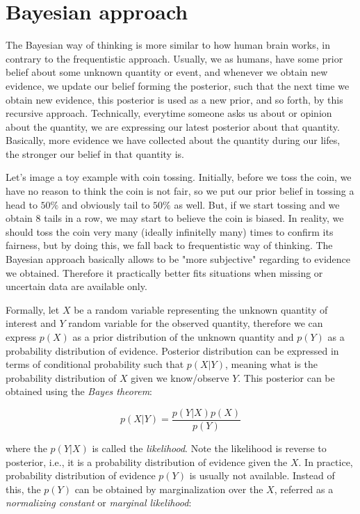 \documentclass[
  digital, %
  oneside, %
  lof,     %
  lot,     %
]{fithesis4}
\begin{document}
\section{Bayesian approach}

The Bayesian way of thinking is more similar to how human 
brain works, in contrary to the frequentistic approach. 
Usually, we as humans, have some prior belief about some 
unknown quantity or event, and whenever we obtain new 
evidence, we update our belief forming the posterior, such 
that the next time we obtain new evidence, this posterior 
is used as a new prior, and so forth, by this recursive approach.
Technically, everytime someone asks us about or opinion 
about the quantity, we are expressing our latest posterior 
about that quantity. 
Basically, more evidence we have collected about the 
quantity during our lifes, the stronger our belief in 
that quantity is.

Let's image a toy example with coin tossing. 
Initially, before we toss the coin, we have no reason 
to think the coin is not fair, so we put our prior belief 
in tossing a head to $50\%$ and obviously tail to 
$50\%$ as well. 
But, if we start tossing and we obtain 8 tails in a row, 
we may start to believe the coin is biased. 
In reality, we should toss the coin very many (ideally 
infinitelly many) times to confirm its fairness, but 
by doing this, we fall back to frequentistic way of 
thinking. 
The Bayesian approach basically allows to be 
"more subjective" regarding to evidence we obtained. 
Therefore it practically better fits situations when 
missing or uncertain data are available only.

Formally, let $X$ be a random variable representing 
the unknown quantity of interest and $Y$ random variable for 
the observed quantity, therefore we can express $p(X)$ 
as a prior distribution of the unknown quantity and 
$p(Y)$ as a probability distribution of evidence. 
Posterior distribution can be expressed in terms of 
conditional probability such that $p(X | Y)$, meaning 
what is the probability distribution of $X$ given we 
know/observe $Y$. 
This posterior can be obtained using the \textit{Bayes 
theorem}:

\begin{equation}\label{eq:bayes-theorem}
p( X | Y ) = \frac{p( Y | X ) p(X)}{p(Y)}
\end{equation}

where the $p( Y | X )$ is called the \textit{likelihood}.
Note the likelihood is reverse to posterior, i.e., it 
is a probability distribution of evidence given the $X$.
In practice, probability distribution of evidence $p(Y)$ 
is usually not available. 
Instead of this, the $p(Y)$ can be obtained by 
marginalization over the $X$, referred as a 
\textit{normalizing constant} or \textit{marginal likelihood}:
\end{document}
